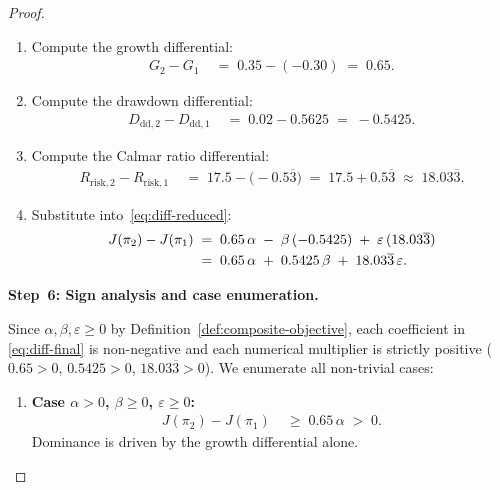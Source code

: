 \documentclass[12pt,openany]{book}
\numberwithin{equation}{chapter}
\theoremstyle{plain}
\theoremstyle{definition}
\theoremstyle{remark}
\numberwithin{equation}{chapter}
\theoremstyle{plain}
\begin{document}
\begin{proof}
\begin{enumerate}
  \item Compute the growth differential:
        \begin{align}
          G_2 - G_1
          &\;=\; 0.35 - (-0.30)
           \;=\; 0.65.
        \end{align}
  \item Compute the drawdown differential:
        \begin{align}
          D_{\mathrm{dd},2} - D_{\mathrm{dd},1}
          &\;=\; 0.02 - 0.5625
           \;=\; -0.5425.
        \end{align}
  \item Compute the Calmar ratio differential:
        \begin{align}
          R_{\mathrm{risk},2} - R_{\mathrm{risk},1}
          &\;=\; 17.5 - \bigl(-0.5\overline{3}\bigr)
           \;=\; 17.5 + 0.5\overline{3}
           \;\approx\; 18.03\overline{3}.
        \end{align}
  \item Substitute into~\eqref{eq:diff-reduced}:
        \begin{align}
          J(\pi_2) - J(\pi_1)
          &\;=\; 0.65\,\alpha
                 \;-\; \beta\,(-0.5425)
                 \;+\; \varepsilon\,(18.03\overline{3}) \notag\\
          &\;=\; 0.65\,\alpha
                 \;+\; 0.5425\,\beta
                 \;+\; 18.03\overline{3}\,\varepsilon.
                 \label{eq:diff-final}
        \end{align}
\end{enumerate}

\medskip
\noindent\textbf{Step~6: Sign analysis and case enumeration.}

Since $\alpha, \beta, \varepsilon \geq 0$ by
Definition~\ref{def:composite-objective}, each coefficient in
\eqref{eq:diff-final} is non-negative and each numerical multiplier
is strictly positive ($0.65 > 0$, $0.5425 > 0$, $18.03\overline{3} > 0$).
We enumerate all non-trivial cases:

\begin{enumerate}
  \item \textbf{Case $\alpha > 0$, $\beta \geq 0$, $\varepsilon \geq 0$:}
        \begin{align}
          J(\pi_2) - J(\pi_1)
          &\;\geq\; 0.65\,\alpha \;>\; 0.
        \end{align}
        Dominance is driven by the growth differential alone.


\end{enumerate}
\end{proof}
\end{document}
